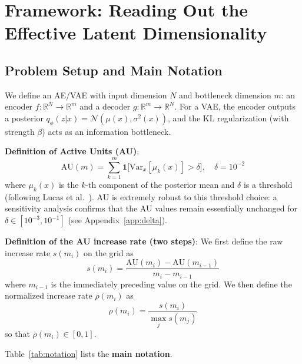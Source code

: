 \documentclass[make,article,submit,pdftex,moreauthors]{Definitions/mdpi}
\newcommand{\R}{\mathbb{R}}
\begin{document}
\section{Framework: Reading Out the Effective Latent Dimensionality}\label{sec:framework}

\subsection{Problem Setup and Main Notation}\label{sec:framework_setup}

We define an AE/VAE with input dimension $N$ and bottleneck dimension $m$:
an encoder $f: \R^N \to \R^m$ and a decoder $g: \R^m \to \R^N$.
For a VAE, the encoder outputs a posterior
$q_\phi(z|x) = \mathcal{N}(\mu(x), \sigma^2(x))$,
and the KL regularization (with strength $\beta$) acts as an information bottleneck.

\textbf{Definition of Active Units (AU)}:
\begin{equation}
  \mathrm{AU}(m) = \sum_{k=1}^{m} \mathbf{1}\bigl[\mathrm{Var}_x[\mu_k(x)] > \delta\bigr],
  \quad \delta = 10^{-2}
  \label{eq:au_def}
\end{equation}
where $\mu_k(x)$ is the $k$-th component of the posterior mean and $\delta$ is a
threshold (following Lucas et al.~\cite{lucas2019elbo}).
AU is extremely robust to this threshold choice: a sensitivity analysis confirms
that the AU values remain essentially unchanged for
$\delta \in [10^{-3}, 10^{-1}]$ (see Appendix~\ref{app:delta}).

\textbf{Definition of the AU increase rate (two steps)}:
We first define the raw increase rate $s(m_i)$ on the grid as
\begin{equation}
  s(m_i) = \frac{\mathrm{AU}(m_i) - \mathrm{AU}(m_{i-1})}{m_i - m_{i-1}}
  \label{eq:au_raw_rate}
\end{equation}
where $m_{i-1}$ is the immediately preceding value on the grid.
We then define the normalized increase rate $\rho(m_i)$ as
\begin{equation}
  \rho(m_i) = \frac{s(m_i)}{\max_j s(m_j)}
  \label{eq:au_rate}
\end{equation}
so that $\rho(m_i) \in [0, 1]$.

Table~\ref{tab:notation} lists the \textbf{main notation}.
\end{document}
